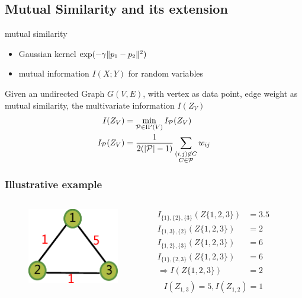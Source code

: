 \documentclass{beamer}
\DeclarePairedDelimiter\abs{\lvert}{\rvert}
\DeclarePairedDelimiter\norm{\lVert}{\rVert}
\begin{document}
\subsection{Mutual Similarity and its extension}
\begin{frame}
\begin{block}{mutual similarity}
\begin{itemize}
\item Gaussian kernel $ \exp({-\gamma \norm{p_1 - p_2}^2})$
\item mutual information $I(X;Y)$ for random variables
\end{itemize}
\end{block}

\begin{definition}
Given an undirected Graph $G(V, E)$, with vertex as data point, edge weight as mutual similarity, the multivariate information $I(Z_V)$
\begin{align}
I(Z_V) & = \min_{\mathcal{P} \in \Pi'(V)} I_{\mathcal{P}}(Z_V) \\
\label{eq:newDef}  I_{\mathcal{P}}(Z_V) & = {1 \over 2 ( \abs{\mathcal{P}} - 1) } \sum_{\substack{(i,j) \not\in C\\ C\in \mathcal{P}}} w_{ij}
\end{align}
\end{definition}
\end{frame}
\begin{frame}
\frametitle{Illustrative example}
\begin{columns}
\column{5cm}
\begin{figure}
\includegraphics[width=4cm]{pic/example.eps}
\end{figure}
\column{5cm}
\begin{align*}
I_{\{1\},\{2\},\{3\}}(Z\{1,2,3\}) & = 3.5 \\
I_{\{1,3\},\{2\}}(Z\{1,2,3\}) & = 2 \\ 
I_{\{1,2\},\{3\}}(Z\{1,2,3\}) & = 6 \\ 
I_{\{1\},\{2,3\}}(Z\{1,2,3\}) & = 6 \\ 
\Rightarrow I(Z\{1,2,3\}) & = 2 \\
\end{align*}
\begin{equation*}
I(Z_{1,3}) = 5, I(Z_{1,2}) = 1
\end{equation*}
\end{columns}
\end{frame}
\end{document}
